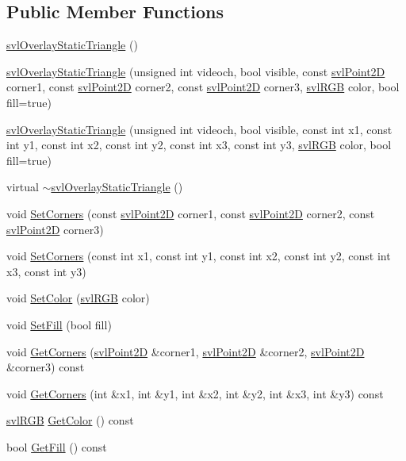 \subsection*{Public Member Functions}
\begin{DoxyCompactItemize}
\item 
\hyperlink{classsvl_overlay_static_triangle_aeef71400c32c7425aab39bc72dbd73c7}{svl\-Overlay\-Static\-Triangle} ()
\item 
\hyperlink{classsvl_overlay_static_triangle_af950ba95e53e7efb89d738047713e427}{svl\-Overlay\-Static\-Triangle} (unsigned int videoch, bool visible, const \hyperlink{structsvl_point2_d}{svl\-Point2\-D} corner1, const \hyperlink{structsvl_point2_d}{svl\-Point2\-D} corner2, const \hyperlink{structsvl_point2_d}{svl\-Point2\-D} corner3, \hyperlink{structsvl_r_g_b}{svl\-R\-G\-B} color, bool fill=true)
\item 
\hyperlink{classsvl_overlay_static_triangle_a7596d394c84ee618e0821170a10a5af5}{svl\-Overlay\-Static\-Triangle} (unsigned int videoch, bool visible, const int x1, const int y1, const int x2, const int y2, const int x3, const int y3, \hyperlink{structsvl_r_g_b}{svl\-R\-G\-B} color, bool fill=true)
\item 
virtual \hyperlink{classsvl_overlay_static_triangle_abf0cabf4e1b95e41048d739e8b4e832e}{$\sim$svl\-Overlay\-Static\-Triangle} ()
\item 
void \hyperlink{classsvl_overlay_static_triangle_a64abc036b99c654c43b985a864bf5313}{Set\-Corners} (const \hyperlink{structsvl_point2_d}{svl\-Point2\-D} corner1, const \hyperlink{structsvl_point2_d}{svl\-Point2\-D} corner2, const \hyperlink{structsvl_point2_d}{svl\-Point2\-D} corner3)
\item 
void \hyperlink{classsvl_overlay_static_triangle_a4486b9d0c9b260cd20fd3c4fc44e0d48}{Set\-Corners} (const int x1, const int y1, const int x2, const int y2, const int x3, const int y3)
\item 
void \hyperlink{classsvl_overlay_static_triangle_a0f727ad318e2389a116511e89bf2c7e1}{Set\-Color} (\hyperlink{structsvl_r_g_b}{svl\-R\-G\-B} color)
\item 
void \hyperlink{classsvl_overlay_static_triangle_a96a642220b6a0be454e87d090096ee28}{Set\-Fill} (bool fill)
\item 
void \hyperlink{classsvl_overlay_static_triangle_a5b57c22438c1d82c85c5ddc8423e9d7a}{Get\-Corners} (\hyperlink{structsvl_point2_d}{svl\-Point2\-D} \&corner1, \hyperlink{structsvl_point2_d}{svl\-Point2\-D} \&corner2, \hyperlink{structsvl_point2_d}{svl\-Point2\-D} \&corner3) const 
\item 
void \hyperlink{classsvl_overlay_static_triangle_a274383239710564927c70b1af0d5eade}{Get\-Corners} (int \&x1, int \&y1, int \&x2, int \&y2, int \&x3, int \&y3) const 
\item 
\hyperlink{structsvl_r_g_b}{svl\-R\-G\-B} \hyperlink{classsvl_overlay_static_triangle_a005014f748d8d3d158eef90b6590ce7b}{Get\-Color} () const 
\item 
bool \hyperlink{classsvl_overlay_static_triangle_aa5f1cbd383d679917f7b4913fc71feb4}{Get\-Fill} () const 
\end{DoxyCompactItemize}
